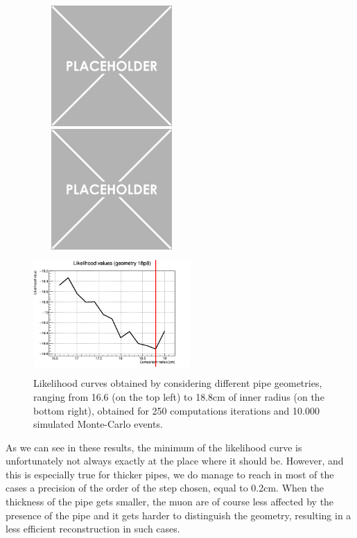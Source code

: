 \documentclass[a4paper, 11pt]{report}
\begin{document}
\begin{figure}[htbp]
\begin{minipage}[b]{.32\textwidth}
\includegraphics[width=6cm, height=4.6cm]{figs/placeholder.png}
\end{minipage}\hfill
\begin{minipage}[b]{.32\textwidth}
\includegraphics[width=6cm, height=4.6cm]{figs/placeholder.png}
\end{minipage} \hfill
\begin{minipage}[b]{.32\textwidth}
\includegraphics[width=6cm, height=4.6cm]{figs/likelihood250LowStat/likelihood18p8.png}
\end{minipage} \hfill
\caption{Likelihood curves obtained by considering different pipe geometries, ranging from 16.6 (on the top left) to 18.8cm of inner radius (on the bottom right), obtained for 250 computations iterations and 10.000 simulated Monte-Carlo events.}
\label{fig:likelihoods3}
\end{figure}

As we can see in these results, the minimum of the likelihood curve is unfortunately not always exactly at the place where it should be. However, and this is especially true for thicker pipes, we do manage to reach in most of the cases a precision of the order of the step chosen, equal to 0.2cm.  When the thickness of the pipe gets smaller, the muon are of course less affected by the presence of the pipe and it gets harder to distinguish the geometry, resulting in a less efficient reconstruction in such cases.
\end{document}

